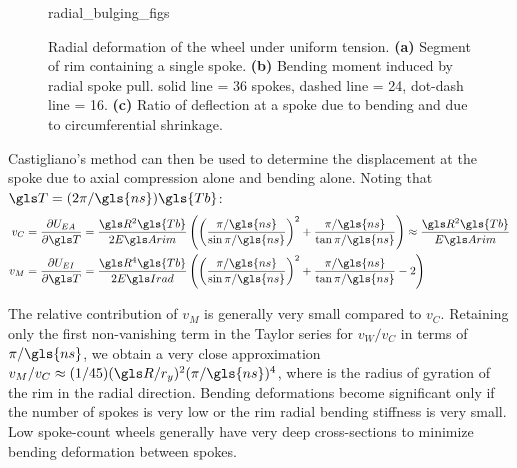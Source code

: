 \documentclass[\rootdir/thesis.tex]{subfiles}
\begin{document}
\begin{figure}
\centering
{radial_bulging_figs}
\caption{Radial deformation of the wheel under uniform tension. \textbf{(a)} Segment of rim containing a single spoke. \textbf{(b)} Bending moment induced by radial spoke pull. solid line = 36 spokes, dashed line = 24, dot-dash line = 16. \textbf{(c)} Ratio of deflection at a spoke due to bending and due to circumferential shrinkage.}
\label{fig:radial_bulging}
\end{figure}

Castigliano's method can then be used to determine the displacement at the spoke due to axial compression alone and bending alone. Noting that $\T = (2\pi/\gls{ns})\gls{Tb}$:
\begin{align}
v_C &= \frac{\partial U_{EA}}{\partial \T} = \frac{\R^2\gls{Tb}}{2\EA} \left( \left(\frac{\pi/\gls{ns}}{\sin{\pi/\gls{ns}}}\right)^2 +
    \frac{\pi/\gls{ns}}{\tan{\pi/\gls{ns}}}\right)
    \approx \frac{\R^2\gls{Tb}}{\EA}\label{eq:vC}\\
v_M &= \frac{\partial U_{EI}}{\partial \T} = \frac{\R^4\gls{Tb}}{2\EIr} \left( \left(\frac{\pi/\gls{ns}}{\sin{\pi/\gls{ns}}}\right)^2 +
    \frac{\pi/\gls{ns}}{\tan{\pi/\gls{ns}}} - 2\right)\label{eq:vM}
\end{align}

The relative contribution of $v_M$ is generally very small compared to $v_C$. Retaining only the first non-vanishing term in the Taylor series for $v_W/v_C$ in terms of $\pi/\gls{ns}$, we obtain a very close approximation $v_M/v_C\approx(1/45)(\R/\ry)^2(\pi/\gls{ns})^4$, where \ry is the radius of gyration of the rim in the radial direction. Bending deformations become significant only if the number of spokes is very low or the rim radial bending stiffness is very small. Low spoke-count wheels generally have very deep cross-sections to minimize bending deformation between spokes.
\end{document}
